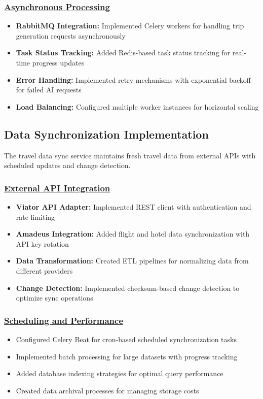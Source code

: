 \subsubsection*{\underline{Asynchronous Processing}}
\begin{itemize}
    \item \textbf{RabbitMQ Integration:} Implemented Celery workers for handling trip generation requests asynchronously
    \item \textbf{Task Status Tracking:} Added Redis-based task status tracking for real-time progress updates
    \item \textbf{Error Handling:} Implemented retry mechanisms with exponential backoff for failed AI requests
    \item \textbf{Load Balancing:} Configured multiple worker instances for horizontal scaling
\end{itemize}

\subsection{Data Synchronization Implementation}
The travel data sync service maintains fresh travel data from external APIs with scheduled updates and change detection.

\subsubsection*{\underline{External API Integration}}
\begin{itemize}
    \item \textbf{Viator API Adapter:} Implemented REST client with authentication and rate limiting
    \item \textbf{Amadeus Integration:} Added flight and hotel data synchronization with API key rotation
    \item \textbf{Data Transformation:} Created ETL pipelines for normalizing data from different providers
    \item \textbf{Change Detection:} Implemented checksum-based change detection to optimize sync operations
\end{itemize}

\subsubsection*{\underline{Scheduling and Performance}}
\begin{itemize}
    \item Configured Celery Beat for cron-based scheduled synchronization tasks
    \item Implemented batch processing for large datasets with progress tracking
    \item Added database indexing strategies for optimal query performance
    \item Created data archival processes for managing storage costs
\end{itemize}

